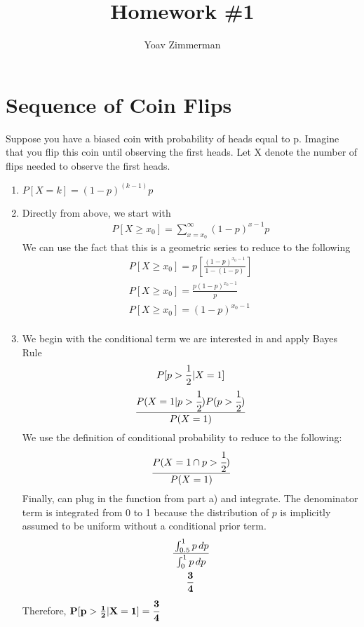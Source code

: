 \documentclass[12pt]{article}
\begin{document}
\title{Homework \#1}
\author{Yoav Zimmerman}
\maketitle

\section{Sequence of Coin Flips}
Suppose you have a biased coin with probability of heads equal to p. Imagine that you flip this coin until observing the first heads. Let X denote the number of flips needed to observe the first heads.

\begin{enumerate}[label=\alph*.]
    \item \( P[X = k] = (1-p)^{(k-1)}p\)
    \item Directly from above, we start with \\
	\begin{gather*}
	    P[X \geq x_0] = \sum_{x = x_0}^{\infty} (1-p)^{x-1}p
	\end{gather*}
             We can use the fact that this is a geometric series to reduce to the following \\
	\begin{gather*}
	    P[X \geq x_0] = p[\frac{(1-p)^{x_0-1}}{1 - (1-p)} ] \\
	    P[X \geq x_0] = \frac{p(1-p)^{x_0-1}}{p} \\
	    P[X \geq x_0] = (1-p)^{x_0-1} \\
	\end{gather*}
    \item We begin with the conditional term we are interested in and apply Bayes Rule
	\begin{gather*}
	    P[p > \frac{1}{2} | X = 1] \\
	    \frac{P(X = 1 | p > \cfrac{1}{2})P(p > \cfrac{1}{2})}{P(X = 1)}
	\end{gather*}
	We use the definition of conditional probability to reduce to the following:
	\begin{gather*}
	    \cfrac{P(X = 1 \cap p > \cfrac{1}{2})}{P(X = 1)} 
	\end{gather*}
	Finally, can plug in the function from part a) and integrate. The denominator term is integrated from 0 to 1 because the distribution of \( p \) is implicitly assumed to be uniform without a conditional prior term.
	\begin{gather*}
	    \cfrac{\int_{0.5}^{1} p \, dp}{\int_{0}^{1} p \, dp} \\
	    \mathbf{\frac{3}{4}}
	\end{gather*}
	Therefore, \( \mathbf{P[p > \frac{1}{2} | X = 1] = \cfrac{3}{4}} \)
\end{enumerate}
\end{document}
